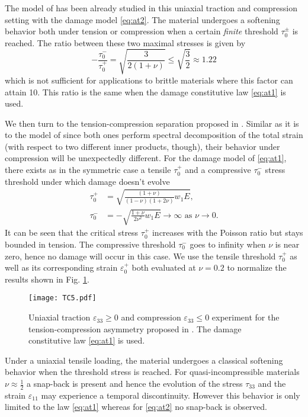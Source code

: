 The model of \cite{AmorMarigoMaurini:2009} has been already studied in this uniaxial traction and compression setting with the damage model \eqref{eq:at2}. The material undergoes a softening behavior both under tension or compression when a certain \emph{finite} threshold $\tau_0^\pm$ is reached. The ratio between these two maximal stresses is given by
\[
-\frac{\tau_0^-}{\tau_0^+}=\sqrt{\frac{3}{2(1+\nu)}}\leq\sqrt{\frac{3}{2}}\approx 1.22
\]
which is not sufficient for applications to brittle materials where this factor can attain 10. This ratio is the same when the damage constitutive law \eqref{eq:at1} is used.

We then turn to the tension-compression separation proposed in \cite{MieheHofackerWelschinger:2010}. Similar as it is to the model of \cite{FreddiRoyer-Carfagni:2010} since both ones perform spectral decomposition of the total strain (with respect to two different inner products, though), their behavior under compression will be unexpectedly different. For the damage model of \eqref{eq:at1}, there exists as in the symmetric case a tensile $\tau_0^+$ and a compressive $\tau_0^-$ stress threshold under which damage doesn't evolve
\begin{align*}
\tau_0^+ &= \sqrt{\frac{(1+\nu)}{(1-\nu)(1+2\nu)}w_1E}, \\
\tau_0^- &= -\sqrt{\frac{1+\nu}{2\nu^2}w_1E}\to\infty\text{ as $\nu\to 0$}.
\end{align*}
It can be seen that the critical stress $\tau_0^+$ increases with the Poisson ratio but stays bounded in tension. The compressive threshold $\tau_0^-$ goes to infinity when $\nu$ is near zero, hence no damage will occur in this case. We use the tensile threshold $\tau_0^+$ as well as its corresponding strain $\varepsilon_0^+$ both evaluated at $\nu=0.2$ to normalize the results shown in Fig. \ref{fig:miehe}.
\begin{figure}[htbp]
\centering
\texttt{[image: TC5.pdf]}
\caption{Uniaxial traction $\varepsilon_{33}\geq 0$ and compression $\varepsilon_{33}\leq 0$ experiment for the tension-compression asymmetry proposed in \cite{MieheHofackerWelschinger:2010}. The damage constitutive law \eqref{eq:at1} is used.} \label{fig:miehe}
\end{figure}

Under a uniaxial tensile loading, the material undergoes a classical softening behavior when the threshold stress is reached. For quasi-incompressible materials $\nu\approx\frac{1}{2}$ a snap-back is present and hence the evolution of the stress $\tau_{33}$ and the strain $\varepsilon_{11}$ may experience a temporal discontinuity. However this behavior is only limited to the law \eqref{eq:at1} whereas for \eqref{eq:at2} no snap-back is observed.

